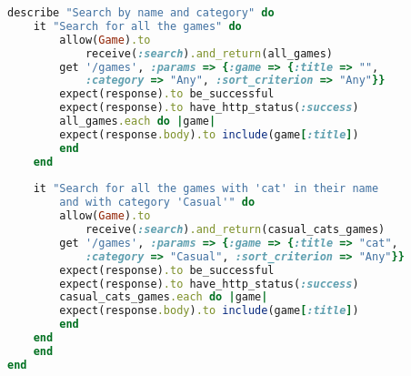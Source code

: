 \begin{lstlisting}[language=Ruby]
    describe "Search by name and category" do
    it "Search for all the games" do
        allow(Game).to 
            receive(:search).and_return(all_games)
        get '/games', :params => {:game => {:title => "", 
            :category => "Any", :sort_criterion => "Any"}}
        expect(response).to be_successful
        expect(response).to have_http_status(:success)
        all_games.each do |game|
        expect(response.body).to include(game[:title])
        end
    end
    
    it "Search for all the games with 'cat' in their name 
        and with category 'Casual'" do
        allow(Game).to 
            receive(:search).and_return(casual_cats_games)
        get '/games', :params => {:game => {:title => "cat", 
            :category => "Casual", :sort_criterion => "Any"}}
        expect(response).to be_successful
        expect(response).to have_http_status(:success)
        casual_cats_games.each do |game|
        expect(response.body).to include(game[:title])
        end
    end
    end
end    
\end{lstlisting}

